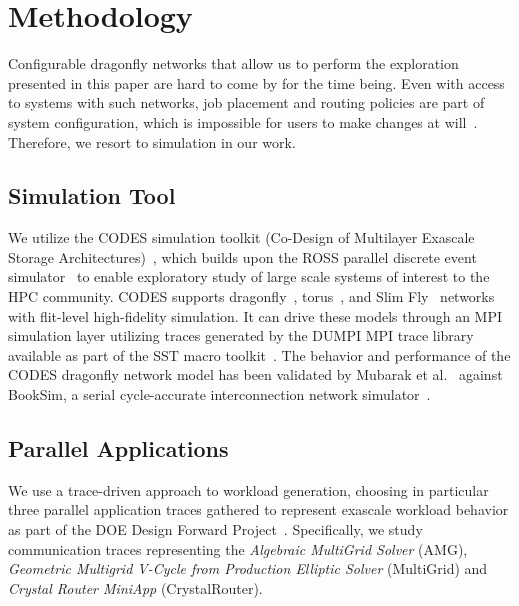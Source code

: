 

\section{Methodology}
\label{sec: methodology}

Configurable dragonfly networks that allow us to perform the exploration presented in this paper are hard to come by for the time being. Even with access to systems with such networks, job placement and routing policies are part of system configuration, which is impossible for users to make changes at will~\cite{jain-sc14, bhatele-sc11, zhou-ipdps-2015, jokanovic-ipdps-2015}. Therefore, we resort to simulation in our work.


\subsection{Simulation Tool}
\label{sec:simulation-tool}

We utilize the CODES simulation toolkit (Co-Design of Multilayer Exascale Storage Architectures)~\cite{misbah-tpds}, which builds upon the ROSS parallel discrete event simulator~\cite{carothers_ross:_2002,barnes_warp_2013} to enable exploratory study of large scale systems of interest to the HPC community. CODES supports dragonfly~\cite{codes-dragonfly, misbah-tpds}, torus~\cite{misbah-pads-2014, ning-pads-2011}, and Slim Fly~\cite{wolfe-pads-2016} networks with flit-level high-fidelity simulation. It can drive these models through an MPI simulation layer utilizing traces generated by the DUMPI MPI trace library available as part of the SST macro toolkit~\cite{sst}. 
The behavior and performance of the CODES dragonfly network model has been validated by Mubarak et al.\ \cite{codes-dragonfly} against BookSim, a serial cycle-accurate interconnection network simulator~\cite{booksim-simulator}.

\subsection{Parallel Applications}
\label{sec: application traces}

We use a trace-driven approach to workload generation, choosing in particular three parallel application traces gathered to represent exascale workload behavior as part of the DOE Design Forward Project~\cite{designforward-webpage,designforward-traces}. Specifically, we study communication traces representing the \emph{Algebraic MultiGrid Solver} (AMG), \emph{Geometric Multigrid V-Cycle from Production Elliptic Solver} (MultiGrid) and \emph{Crystal Router MiniApp} (CrystalRouter).

